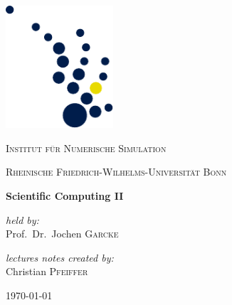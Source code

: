 \documentclass{scrbook}
\begin{document}
\frontmatter
\begin{titlepage}

	\centering

	\includegraphics[width=0.30\textwidth]{INS-Logo_ohne}\par\vspace{2.2cm}
	
	\textsc{\LARGE Institut für Numerische Simulation}\par\vspace{0.3cm}
	\textsc{\small Rheinische Friedrich-Wilhelms-Universität Bonn}\par\vspace{0.9cm}
	
	\vfill

	\begin{mdframed}[rightline=false,linewidth=0.5mm,leftline=false,innerbottommargin=\baselineskip,innertopmargin=\baselineskip]
	\centering\textbf{\huge Scientific Computing II}
	\end{mdframed}
	
	\vspace{1.5cm}
	
	\begin{minipage}{0.4\textwidth}
		\centering\large
		\textit{held by:} \\
		Prof.\ Dr.\ Jochen \textsc{Garcke}
	\end{minipage}
	\vfill
	\vfill
	\vfill
	\vfill
	\begin{minipage}{0.4\textwidth}
		\centering\large
		\textit{lectures notes created by:}\\
		Christian \textsc{Pfeiffer}
	\end{minipage}
	
	\vfill

	{\large \today}

\end{titlepage}

\printacronyms
\tableofcontents

\mainmatter











\backmatter
\printindex[keydefinitions]
\printbibliography[heading=bibintoc]
\end{document}
